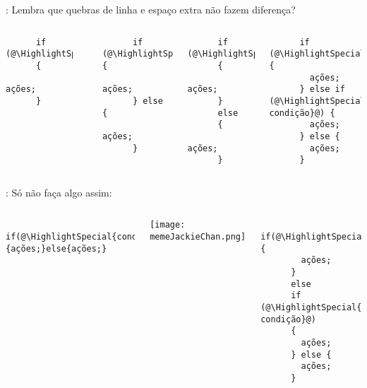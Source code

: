 \begin{frame}[fragile]{\insertsection: \insertsubsection}
  Lembra que quebras de linha e espaço extra não fazem diferença?
  \begin{columns}[t]
    \begin{verbatim}
      if (@\HighlightSpecial{condição}@)
      {
      	ações;
      }
    \end{verbatim}
    \vspace{-\bigskipamount}\\
    \begin{verbatim}
      if (@\HighlightSpecial{condição}@) {
      	ações;
      } else {
      	ações;
      }
    \end{verbatim}
    \begin{verbatim}
      if (@\HighlightSpecial{condição}@)
      {
      	ações;
      }
      else
      {
      	ações;
      }
    \end{verbatim}
    \begin{verbatim}
      if (@\HighlightSpecial{condição}@) {
      	ações;
      } else if (@\HighlightSpecial{outra condição}@) {
      	ações;
      } else {
      	ações;
      }
    \end{verbatim}
  \end{columns}
\end{frame}


\begin{frame}[fragile]{\insertsection: \insertsubsection}
  Só não faça algo assim:
  \begin{columns}[t]
    \begin{verbatim}
      if(@\HighlightSpecial{condição}@){ações;}else{ações;}
    \end{verbatim}
    \texttt{[image: memeJackieChan.png]}
    \begin{verbatim}
      if(@\HighlightSpecial{condição}@) {
      	ações;
      }
      else
      if (@\HighlightSpecial{outra condição}@)
      {
      	ações;
      } else {
      	ações;
      }
    \end{verbatim}
  \end{columns}
\end{frame}



